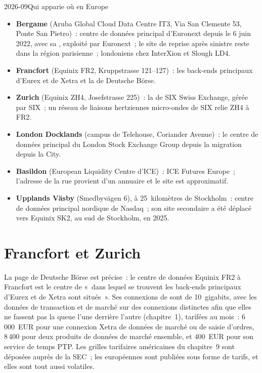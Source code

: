 \begin{dated}{2026-09}{Qui apparie où en Europe}\label{dat:nw:the-european-map:sites}
\begin{itemize}
\item \textbf{Bergame} (Aruba Global Cloud Data Centre IT3, Via San Clemente 53, Ponte San Pietro)~: centre de données principal d'Euronext depuis le 6 juin
  2022, avec sa , exploité par Euronext~; le site de reprise après sinistre reste dans la région parisienne~;  londoniens chez InterXion
  et Slough LD4.
\item \textbf{Francfort} (Equinix FR2, Kruppstrasse 121--127)~: les back-ends principaux d'Eurex et de Xetra et la  de Deutsche Börse.
\item \textbf{Zurich} (Equinix ZH4, Josefstrasse 225)~: la  de SIX Swiss Exchange, gérée par SIX~; un réseau de liaisons hertziennes micro-ondes de SIX relie ZH4
  à FR2.
\item \textbf{London Docklands} (campus de Telehouse, Coriander Avenue)~: le centre de données principal du London Stock Exchange Group depuis la
  migration depuis la City.
\item \textbf{Basildon} (European Liquidity Centre d'ICE)~: ICE Futures Europe~; l'adresse de la rue provient d'un annuaire et le site est approximatif.
\item \textbf{Upplands Väsby} (Smedbyvägen 6), à 25~kilomètres de Stockholm~: centre de données principal nordique de Nasdaq~; son site secondaire a été déplacé vers
  Equinix SK2, au sud de Stockholm, en 2025.
\end{itemize}
\end{dated}

\section{Francfort et Zurich}

La page de Deutsche Börse est précise~: le centre de données Equinix FR2 à Francfort est le centre de  «~dans lequel se trouvent les back-ends principaux d'Eurex et
de Xetra sont situés~». Ses connexions de  sont de 10~gigabits, avec les données de transaction et de marché sur des connexions distinctes afin que
elles ne fassent pas la queue l'une derrière l'autre (chapitre~1), tarifées au mois~: 6\,000~EUR pour une connexion Xetra de données de marché ou de saisie d'ordres, 8\,400
pour deux produits de données de marché ensemble, et 400~EUR pour son service de temps PTP. Les grilles tarifaires américaines du chapitre~9 sont déposées auprès de la SEC~; les
européennes sont publiées sous forme de tarifs, et elles sont tout aussi volatiles.

